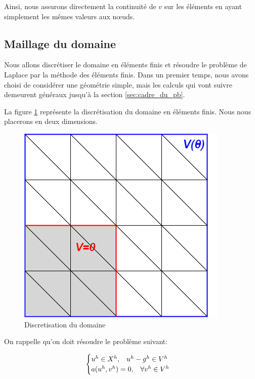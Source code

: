 \documentclass{article}
\begin{document}
Ainsi, nous assurons directement la continuité de $v$ sur les éléments en
ayant simplement les mêmes valeurs aux nœuds.

\newpage

\subsection{Maillage du domaine}
\label{sec:maillage}

\hspace{0.5cm}
Nous allons discrétiser le domaine en éléments finis et résoudre le problème
de Laplace par la méthode des éléments finis. Dans un premier temps,
nous avons choisi de considérer une géométrie simple, mais les calculs
qui vont suivre demeurent généraux jusqu'à la section \ref{sec:cadre_du_pb}.

La figure \ref{fig:pointe_ef} représente la discrétisation du domaine en éléments
finis. Nous nous placerons en deux dimensions.

\begin{figure}[h]
    \centering
    \hspace{1cm} \includegraphics[scale= 0.7]{img/pointe_ef.png}
    \caption{Discretisation du domaine}
    \label{fig:pointe_ef}
\end{figure}

On rappelle qu'on doit résoudre le problème suivant:

\begin{equation}
    \begin{cases}
        u^h \in X^h, \hspace{0.3cm} u^h - g^h \in V^h \\
        a(u^h, v^h) = 0, \hspace{0.3cm} \forall v^h \in V^h
    \end{cases}   
\end{equation}
\end{document}
